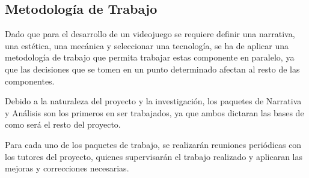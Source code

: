 \subsection{Metodología de Trabajo}
Dado que para el desarrollo de un videojuego se requiere definir una narrativa, una estética, una mecánica y seleccionar una tecnología, se ha de aplicar una metodología de trabajo que permita trabajar estas componente en paralelo, ya que las decisiones que se tomen en un punto determinado afectan al resto de las componentes.

Debido a la naturaleza del proyecto y la investigación, los paquetes de Narrativa y Análisis son los primeros en ser trabajados, ya que ambos dictaran las bases de como será el resto del proyecto.

Para cada uno de los paquetes de trabajo, se realizarán reuniones periódicas con los tutores del proyecto, quienes supervisarán el trabajo realizado y aplicaran las mejoras y correcciones necesarias.